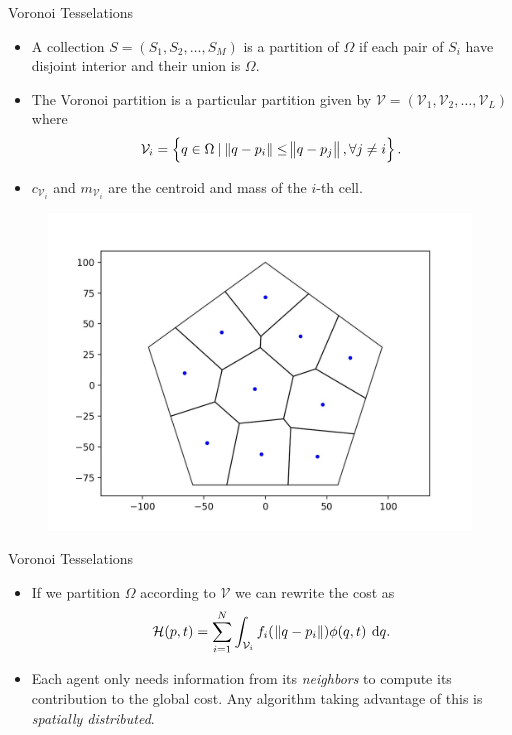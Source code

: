 \documentclass[9pt]{beamer}
\newcommand{\V}{\mathcal{V}}
\begin{document}
\begin{frame}{Voronoi Tesselations}
	\begin{itemize}
		\item A collection $S = (S_1, S_2, \dots, S_M)$ is a partition of $\Omega$ if each pair of $S_i$ have disjoint interior and their union is $\Omega$. 
		\item The Voronoi partition is a particular partition given by $\V = (\V_1, \V_2, \dots, \V_L)$ where
		\begin{equation*}
			\displaystyle \V_i = \left\{ q \in \Omega \: | \: \norm{q - p_i} \leq \norm{q - p_j}, \forall j \neq i \right\}.
		\end{equation*}  
		\item $c_{\V_i}$ and $m_{\V_i}$ are the centroid and mass of the $i$-th cell. 
	\end{itemize}
	\begin{figure}[H]
		\centering 
		\includegraphics[scale=0.33]{voronoi_partition}
	\end{figure}
\end{frame}

\begin{frame}{Voronoi Tesselations}
	\begin{itemize}
		\item If we partition $\Omega$ according to $\V$ we can rewrite the cost as 
		\begin{equation*}
			\displaystyle \mathcal{H}(p, t) = \sum\limits_{i=1}^{N}{\int_{\V_i}{f_i(\:\norm{q - p_i}) \phi(q,t)\: \dif q}}.
		\end{equation*}
		\item Each agent only needs information from its \textit{neighbors} to compute its contribution to the global cost. Any algorithm taking advantage of this is \textit{spatially distributed}. 
	\end{itemize}
\end{frame}
\end{document}
